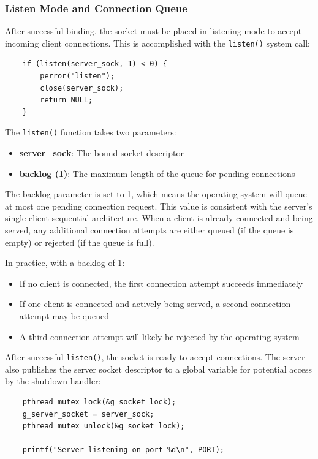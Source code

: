 \subsubsection{Listen Mode and Connection Queue}

After successful binding, the socket must be placed in listening mode to accept incoming client connections. This is accomplished with the \texttt{listen()} system call:

\begin{verbatim}
	if (listen(server_sock, 1) < 0) {
		perror("listen"); 
		close(server_sock); 
		return NULL;
	}
\end{verbatim}

The \texttt{listen()} function takes two parameters:
\begin{itemize}
	\item \textbf{server\_sock}: The bound socket descriptor
	\item \textbf{backlog (1)}: The maximum length of the queue for pending connections
\end{itemize}

The backlog parameter is set to 1, which means the operating system will queue at most one pending connection request. This value is consistent with the server's single-client sequential architecture. When a client is already connected and being served, any additional connection attempts are either queued (if the queue is empty) or rejected (if the queue is full).

In practice, with a backlog of 1:
\begin{itemize}
	\item If no client is connected, the first connection attempt succeeds immediately
	\item If one client is connected and actively being served, a second connection attempt may be queued
	\item A third connection attempt will likely be rejected by the operating system
\end{itemize}

After successful \texttt{listen()}, the socket is ready to accept connections. The server also publishes the server socket descriptor to a global variable for potential access by the shutdown handler:

\begin{verbatim}
	pthread_mutex_lock(&g_socket_lock);
	g_server_socket = server_sock;
	pthread_mutex_unlock(&g_socket_lock);
	
	printf("Server listening on port %d\n", PORT);
\end{verbatim}

